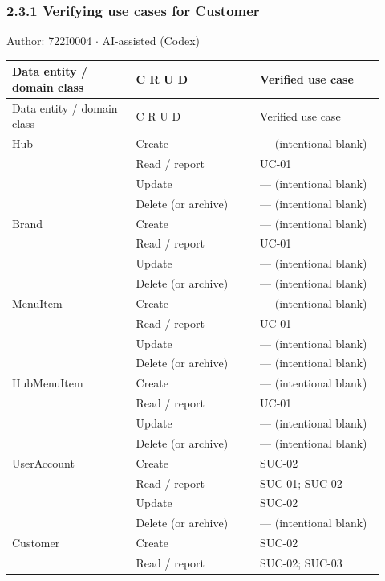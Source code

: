 \subsubsection*{2.3.1 Verifying use cases for Customer}
Author: 722I0004 \ensuremath{\cdot} AI-assisted (Codex)

\begin{longtable}{>{\raggedright\arraybackslash}p{0.3067\linewidth}>{\raggedright\arraybackslash}p{0.3067\linewidth}>{\raggedright\arraybackslash}p{0.3067\linewidth}}
Data entity / domain class & C R U D & Verified use case \\
\hline\endfirsthead
Data entity / domain class & C R U D & Verified use case \\
\hline\endhead
Hub & Create & --- (intentional blank) \\
 & Read / report & UC-01 \\
 & Update & --- (intentional blank) \\
 & Delete (or archive) & --- (intentional blank) \\
Brand & Create & --- (intentional blank) \\
 & Read / report & UC-01 \\
 & Update & --- (intentional blank) \\
 & Delete (or archive) & --- (intentional blank) \\
MenuItem & Create & --- (intentional blank) \\
 & Read / report & UC-01 \\
 & Update & --- (intentional blank) \\
 & Delete (or archive) & --- (intentional blank) \\
HubMenuItem & Create & --- (intentional blank) \\
 & Read / report & UC-01 \\
 & Update & --- (intentional blank) \\
 & Delete (or archive) & --- (intentional blank) \\
UserAccount & Create & SUC-02 \\
 & Read / report & SUC-01; SUC-02 \\
 & Update & SUC-02 \\
 & Delete (or archive) & --- (intentional blank) \\
Customer & Create & SUC-02 \\
 & Read / report & SUC-02; SUC-03 \\

\end{longtable}
